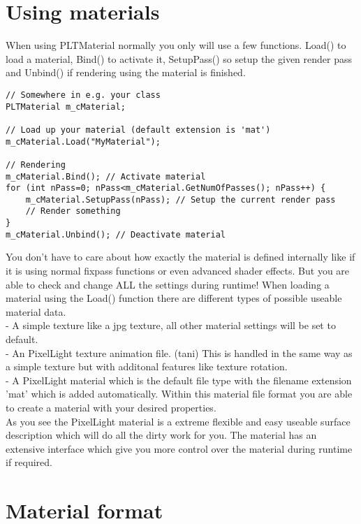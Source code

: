 \section{Using materials}
When using PLTMaterial normally you only will use a few functions. Load() to load a material,
Bind() to activate it, SetupPass() so setup the given render pass and Unbind() if rendering using the
material is finished.\\

\begin{lstlisting}[caption=Using materials]
// Somewhere in e.g. your class
PLTMaterial m_cMaterial;

// Load up your material (default extension is 'mat')
m_cMaterial.Load("MyMaterial");

// Rendering
m_cMaterial.Bind(); // Activate material
for (int nPass=0; nPass<m_cMaterial.GetNumOfPasses(); nPass++) {
    m_cMaterial.SetupPass(nPass); // Setup the current render pass
    // Render something
}
m_cMaterial.Unbind(); // Deactivate material
\end{lstlisting}

You don't have to care about how exactly the material is defined internally like if it is using
normal fixpass functions or even advanced shader effects. But you are able to check and change ALL
the settings during runtime!
When loading a material using the Load() function there are different types of possible useable
material data.\\
- A simple texture like a jpg texture, all other material settings will be set to default.\\
- An PixelLight texture animation file. (tani) This is handled in the same way as a simple texture
  but with additonal features like texture rotation.\\
- A PixelLight material which is the default file type with the filename extension 'mat' which is
  added automatically. Within this material file format you are able to create a material with your
  desired properties.\\

As you see the PixelLight material is a extreme flexible and easy useable surface description which will do
all the dirty work for you. The material has an extensive interface which give you more control
over the material during runtime if required.




\section{Material format}




